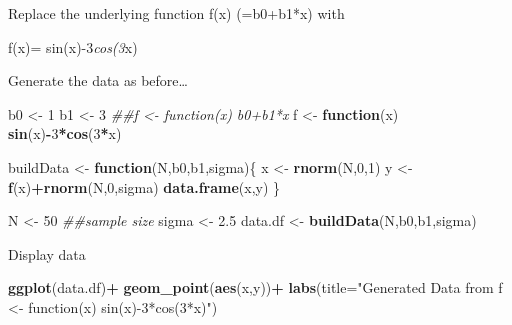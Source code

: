 \documentclass[]{article}
\newenvironment{Shaded}{\begin{snugshade}}{\end{snugshade}}
\newcommand{\CommentTok}[1]{\textcolor[rgb]{0.56,0.35,0.01}{\textit{#1}}}
\newcommand{\ControlFlowTok}[1]{\textcolor[rgb]{0.13,0.29,0.53}{\textbf{#1}}}
\newcommand{\DataTypeTok}[1]{\textcolor[rgb]{0.13,0.29,0.53}{#1}}
\newcommand{\DecValTok}[1]{\textcolor[rgb]{0.00,0.00,0.81}{#1}}
\newcommand{\FloatTok}[1]{\textcolor[rgb]{0.00,0.00,0.81}{#1}}
\newcommand{\KeywordTok}[1]{\textcolor[rgb]{0.13,0.29,0.53}{\textbf{#1}}}
\newcommand{\NormalTok}[1]{#1}
\newcommand{\OperatorTok}[1]{\textcolor[rgb]{0.81,0.36,0.00}{\textbf{#1}}}
\newcommand{\StringTok}[1]{\textcolor[rgb]{0.31,0.60,0.02}{#1}}
\begin{document}
Replace the underlying function f(x) (=b0+b1*x) with

f(x)= sin(x)-3\emph{cos(3}x)

Generate the data as before\ldots{}

\begin{Shaded}
\begin{Highlighting}[]
\NormalTok{b0 <-}\StringTok{ }\DecValTok{1}
\NormalTok{b1 <-}\StringTok{ }\DecValTok{3}
\CommentTok{##f <- function(x) b0+b1*x}
\NormalTok{f <-}\StringTok{ }\ControlFlowTok{function}\NormalTok{(x) }\KeywordTok{sin}\NormalTok{(x)}\OperatorTok{-}\DecValTok{3}\OperatorTok{*}\KeywordTok{cos}\NormalTok{(}\DecValTok{3}\OperatorTok{*}\NormalTok{x)}
\end{Highlighting}
\end{Shaded}

\begin{Shaded}
\begin{Highlighting}[]
\NormalTok{buildData <-}\StringTok{ }\ControlFlowTok{function}\NormalTok{(N,b0,b1,sigma)\{}
\NormalTok{  x <-}\StringTok{ }\KeywordTok{rnorm}\NormalTok{(N,}\DecValTok{0}\NormalTok{,}\DecValTok{1}\NormalTok{)}
\NormalTok{  y <-}\KeywordTok{f}\NormalTok{(x)}\OperatorTok{+}\KeywordTok{rnorm}\NormalTok{(N,}\DecValTok{0}\NormalTok{,sigma)}
  \KeywordTok{data.frame}\NormalTok{(x,y)}
\NormalTok{\}}

\NormalTok{N <-}\StringTok{ }\DecValTok{50}  \CommentTok{##sample size}
\NormalTok{sigma <-}\StringTok{ }\FloatTok{2.5}
\NormalTok{data.df <-}\StringTok{ }\KeywordTok{buildData}\NormalTok{(N,b0,b1,sigma)}
\end{Highlighting}
\end{Shaded}

Display data

\begin{Shaded}
\begin{Highlighting}[]
\KeywordTok{ggplot}\NormalTok{(data.df)}\OperatorTok{+}
\StringTok{    }\KeywordTok{geom_point}\NormalTok{(}\KeywordTok{aes}\NormalTok{(x,y))}\OperatorTok{+}
\StringTok{  }\KeywordTok{labs}\NormalTok{(}\DataTypeTok{title=}\StringTok{"Generated Data from f <- function(x) sin(x)-3*cos(3*x)"}\NormalTok{)}
\end{Highlighting}
\end{Shaded}
\end{document}
